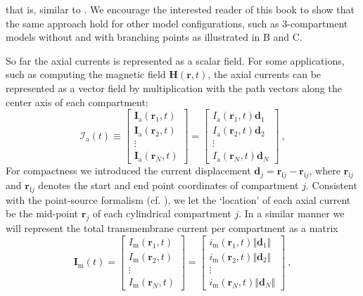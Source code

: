 %
that is, similar to .
We encourage the interested reader of this book to show that the same approach hold for other model configurations, such
as 3-compartment models without and with branching points as illustrated in B and C.

So far the axial currents is represented as a scalar field.
For some applications, such as computing the magnetic field $\mathbf{H}(\mathbf{r}, t)$,
the axial currents can be represented as a vector field by multiplication with the path vectors along the center axis of each compartment:
%
\begin{equation}
\mathcal{I}_\mathrm{a}(t) \equiv
\begin{bmatrix}
\mathbf{I}_\mathrm{a}(\mathbf{r}_1, t)\\
\mathbf{I}_\mathrm{a}(\mathbf{r}_2, t)\\
\vdots \\
\mathbf{I}_\mathrm{a}(\mathbf{r}_N, t)
\end{bmatrix}
=
\begin{bmatrix}
I_\mathrm{a}(\mathbf{r}_1, t) \mathbf{d}_1 \\
I_\mathrm{a}(\mathbf{r}_2, t) \mathbf{d}_2 \\
\vdots \\
I_\mathrm{a}(\mathbf{r}_N, t) \mathbf{d}_N
\end{bmatrix} ~,
\end{equation}
%
For compactness we introduced the current displacement $\mathbf{d}_j=\mathbf{r}_{\mathrm{f}j} - \mathbf{r}_{\mathrm{i}j}$,
where $\mathbf{r}_{\mathrm{i}j}$ and $\mathbf{r}_{\mathrm{f}j}$ denotes the start and end point coordinates of compartment $j$.
Consistent with the point-source formalism (cf. ),
we let the `location' of each axial current be the mid-point $\mathbf{r}_j$ of each cylindrical compartment $j$.
In a similar manner we will represent the total transmembrane current per compartment as a matrix
\begin{equation}
\mathbf{I}_\mathrm{m}(t) =
\begin{bmatrix}
I_\mathrm{m}(\mathbf{r}_1, t) \\
I_\mathrm{m}(\mathbf{r}_2, t) \\
\vdots \\
I_\mathrm{m}(\mathbf{r}_N, t)
\end{bmatrix}
=
\begin{bmatrix}
i_\mathrm{m}(\mathbf{r}_1, t) \Vert \mathbf{d}_1 \Vert \\
i_\mathrm{m}(\mathbf{r}_2, t) \Vert \mathbf{d}_2 \Vert \\
\vdots \\
i_\mathrm{m}(\mathbf{r}_N, t) \Vert \mathbf{d}_N \Vert
\end{bmatrix} ~,
\end{equation}
